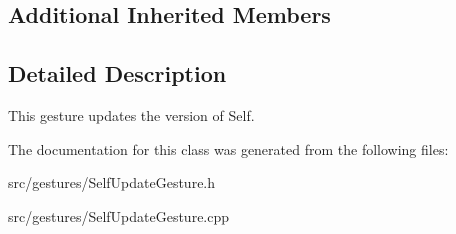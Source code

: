 \subsection*{Additional Inherited Members}


\subsection{Detailed Description}
This gesture updates the version of Self. 

The documentation for this class was generated from the following files\+:\begin{DoxyCompactItemize}
\item 
src/gestures/Self\+Update\+Gesture.\+h\item 
src/gestures/Self\+Update\+Gesture.\+cpp\end{DoxyCompactItemize}
